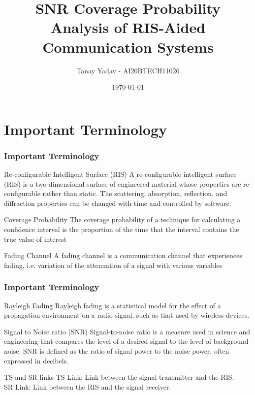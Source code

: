 \documentclass{beamer}
\title{SNR Coverage Probability Analysis of RIS-Aided Communication Systems}
\author{Tanay Yadav - AI20BTECH11026}
\date{\today}
\begin{document}
\begin{frame}
\titlepage
\end{frame}
\section{Important Terminology}
\begin{frame}
    \frametitle{Important Terminology}
    \begin{block}{Re-configurable Intelligent Surface (RIS)}
        A re-configurable intelligent surface (RIS) is a two-dimensional surface of engineered material whose properties are re-configurable rather than static. The scattering, absorption, reflection, and diffraction properties can be changed with time and controlled by software.
    \end{block}
    \begin{block}{Coverage Probability}
        The coverage probability of a technique for calculating a confidence interval is the proportion of the time that the interval contains the true value of interest
    \end{block}
    \begin{block}{Fading Channel}
        A fading channel is a communication channel that experiences fading, i.e. variation of the attenuation of a signal with various variables
    \end{block}
\end{frame}
\begin{frame}
    \frametitle{Important Terminology}
    \begin{block}{Rayleigh Fading}
        Rayleigh fading is a statistical model for the effect of a propagation environment on a radio signal, such as that used by wireless devices.
    \end{block}
    \begin{block}{Signal to Noise ratio (SNR)}
        Signal-to-noise ratio is a measure used in science and engineering that compares the level of a desired signal to the level of background noise. SNR is defined as the ratio of signal power to the noise power, often expressed in decibels.
    \end{block}
    \begin{block}{TS and SR links}
        TS Link: Link between the signal transmitter and the RIS.
      \\SR Link: Link between the RIS and the signal receiver. 
    \end{block}
\end{frame}
\end{document}
